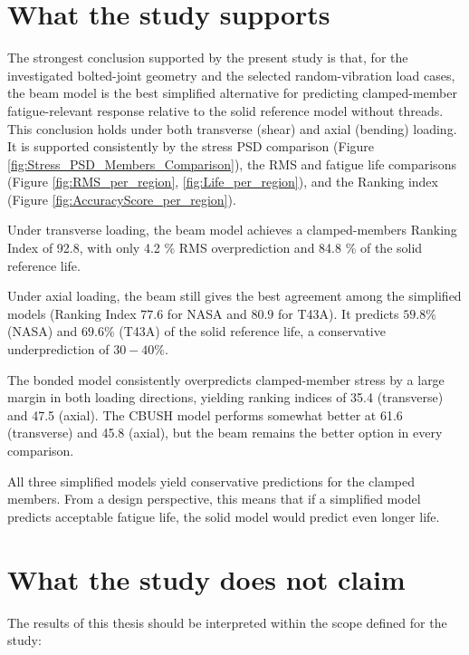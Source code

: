 \documentclass[a4paper,twoside]{bth}
\begin{document}
\section{What the study supports}
The strongest conclusion supported by the present study is that, for the investigated bolted-joint geometry and the selected random-vibration load cases, the beam model is the best simplified alternative for predicting clamped-member fatigue-relevant response relative to the solid reference model without threads. This conclusion holds under both transverse (shear) and axial (bending) loading. It is supported consistently by the stress \ac{PSD} comparison (Figure \ref{fig:Stress_PSD_Members_Comparison}), the \ac{RMS} and fatigue life comparisons (Figure \ref{fig:RMS_per_region}, \ref{fig:Life_per_region}), and the Ranking index (Figure \ref{fig:AccuracyScore_per_region}).

Under transverse loading, the beam model achieves a clamped-members Ranking Index of 92.8, with only 4.2 \% \ac{RMS} overprediction and 84.8 \% of the solid reference life.

Under axial loading, the beam still gives the best agreement among the simplified models (Ranking Index $77.6$ for NASA and $80.9$ for T43A). It predicts $59.8 \%$ (NASA) and $69.6 \%$ (T43A) of the solid reference life, a conservative underprediction of $30-40 \%$.

The bonded model consistently overpredicts clamped-member stress by a large margin in both loading directions, yielding ranking indices of 35.4 (transverse) and 47.5 (axial). The CBUSH model performs somewhat better at 61.6 (transverse) and 45.8 (axial), but the beam remains the better option in every comparison.

All three simplified models yield conservative predictions for the clamped members. From a design perspective, this means that if a simplified model predicts acceptable fatigue life, the solid model would predict even longer life.

\section{What the study does not claim}
The results of this thesis should be interpreted within the scope defined for the study:
\end{document}
